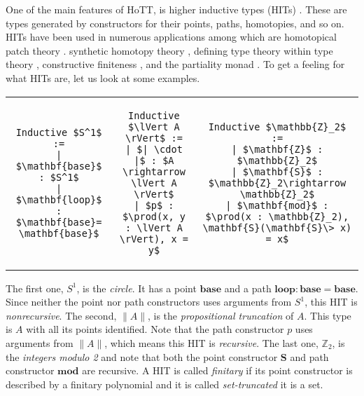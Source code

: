 \documentclass[9pt]{entcs}
\newcommand{\constructor}[1]{\mathbf{#1}}
\newcommand{\deprod}[3]{\prod(#1 : #2), #3} %
\newcommand{\0}{\textbf{0}} %
\newcommand{\trunct}[1]{\lVert #1 \rVert} %
\newcommand{\truncel}[1]{| #1 |} %
\newcommand{\Circ}{S^1} %
\newcommand{\base}{\constructor{base}} %
\newcommand{\loopS}{\constructor{loop}} %
\newcommand{\modZ}{\mathbb{Z}_2} %
\newcommand{\ZZ}{\constructor{Z}} %
\newcommand{\SZ}{\constructor{S}} %
\newcommand{\modP}{\constructor{mod}} %
\begin{document}
One of the main features of HoTT, is higher inductive types (HITs) \cite{hottbook}.
These are types generated by constructors for their points, paths, homotopies, and so on.
HITs have been used in numerous applications among which are homotopical patch theory \cite{AngiuliMLH16}. synthetic homotopy theory \cite{LicataF14,LicataS13,hottbook}, defining type theory within type theory \cite{AltenkirchK16}, constructive finiteness \cite{FruminGGW18}, and the partiality monad \cite{AltenkirchDK17}.
To get a feeling for what HITs are, let us look at some examples.

\lstset{language=Coq}
\setlength{\tabcolsep}{30pt}	
\begin{tabular}{ c c c }

\begin{lstlisting}[mathescape=true]
Inductive $\Circ$ :=
| $\base$ : $\Circ$
| $\loopS$ : $\base = \base$
\end{lstlisting}
&
\begin{lstlisting}[mathescape=true]
Inductive $\trunct{A}$ :=
| $\truncel{\cdot}$ : $A \rightarrow \trunct{A}$
| $p$ : $\deprod{x, y}{\trunct{A}}{x = y}$
\end{lstlisting}
&
\begin{lstlisting}[mathescape=true]
Inductive $\modZ$ :=
| $\ZZ$ : $\modZ$
| $\SZ$ : $\modZ \rightarrow \modZ$
| $\modP$ : $\deprod{x}{\modZ}{\SZ(\SZ \> x) = x}$
\end{lstlisting}
\end{tabular}

The first one, $\Circ$, is the \emph{circle}.
It has a point $\base$ and a path $\loopS : \base = \base$.
Since neither the point nor path constructors uses arguments from $\Circ$, this HIT is \emph{nonrecursive}.
The second, $\trunct{A}$, is the \emph{propositional truncation} of $A$.
This type is $A$ with all its points identified.
Note that the path constructor $p$ uses arguments from $\trunct{A}$, which means this HIT is \emph{recursive}.
The last one, $\modZ$, is the \emph{integers modulo 2} and note that both the point constructor $\SZ$ and path constructor $\modP$ are recursive.
A HIT is called \emph{finitary} if its point constructor is described by a finitary polynomial and it is called \emph{set-truncated} it is a set.
\end{document}
